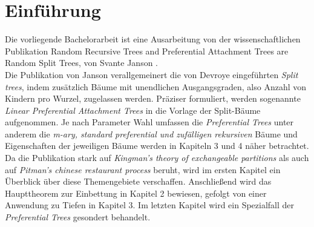 \chapter{Einführung}
Die vorliegende Bachelorarbeit ist eine Ausarbeitung von der wissenschaftlichen Publikation \glqq Random Recursive Trees and Preferential Attachment Trees are Random Split Trees\grqq, von Svante Janson \cite{janson2019random}.\\
Die Publikation von Janson verallgemeinert die von Devroye \cite{devroye1998universal} eingeführten \textit{Split trees}, indem zusätzlich Bäume mit unendlichen Ausgangsgraden, also Anzahl von Kindern pro Wurzel, zugelassen werden. Präziser formuliert, werden sogenannte \textit{Linear Preferential Attachment Trees} in die Vorlage der Split-Bäume aufgenommen. Je nach Parameter Wahl umfassen die \textit{Preferential Trees} unter anderem die \textit{m-ary, standard preferential und zufälligen rekursiven} Bäume und Eigenschaften der jeweiligen Bäume werden in Kapiteln 3 und 4 näher betrachtet. Da die Publikation stark auf \textit{Kingman's theory of exchangeable partitions} \cite{kingman1978representation,kingman1982coalescent} als auch auf \textit{Pitman's chinese restaurant process} \cite{pitman2006combinatorial,pitman1995exchangeable} beruht, wird im ersten Kapitel ein Überblick über diese Themengebiete verschaffen. Anschließend wird das Haupttheorem zur Einbettung in Kapitel 2 bewiesen, gefolgt von einer Anwendung zu Tiefen in Kapitel 3. Im letzten Kapitel wird ein Spezialfall der \textit{Preferential Trees} gesondert behandelt.
